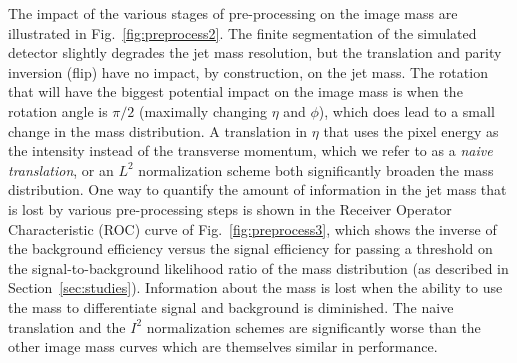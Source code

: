 The impact of the various stages of pre-processing on the image mass are illustrated in Fig.~\ref{fig:preprocess2}.  The finite segmentation of the simulated detector slightly degrades the jet mass resolution, but the translation and parity inversion (flip) have no impact, by construction, on the jet mass.  The rotation that will have the biggest potential impact on the image mass is when the rotation angle is $\pi/2$ (maximally changing $\eta$ and $\phi$), which does lead to a small change in the mass distribution.  A translation in $\eta$ that uses the pixel energy as the intensity instead of the transverse momentum, which we refer to as a \textit{naive translation}, or an $L^2$ normalization scheme both significantly broaden the mass distribution.  One way to quantify the amount of information in the jet mass that is lost by various pre-processing steps is shown in the Receiver Operator Characteristic (ROC) curve of Fig.~\ref{fig:preprocess3}, which shows the inverse of the background efficiency versus the signal efficiency for passing a threshold on the signal-to-background likelihood ratio of the mass distribution (as described in Section~\ref{sec:studies}).  Information about the mass is lost when the ability to use the mass to differentiate signal and background is diminished.  The naive translation and the $I^2$ normalization schemes are significantly worse than the other image mass curves which are themselves similar in performance. 

